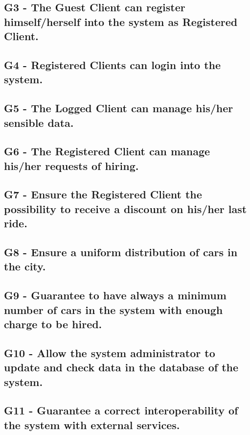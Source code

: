 \subsection{G3 - The Guest Client can register himself/herself into the system as Registered Client.}

\subsection{G4 - Registered Clients can login into the system.}

\subsection{G5 - The Logged Client can manage his/her sensible data. }

\subsection{G6 - The Registered Client can manage his/her requests of hiring.}

\subsection{G7 - Ensure the Registered Client the possibility to receive a discount on his/her last ride.}

\subsection{G8 - Ensure a uniform distribution of cars in the city. }

\subsection{G9 - Guarantee to have always a minimum number of cars in the system with enough charge to be hired.
}

\subsection{G10 - Allow the system administrator to update and check data in the database of the system.}

\subsection{G11 - Guarantee a correct interoperability of the system with external services.
}

